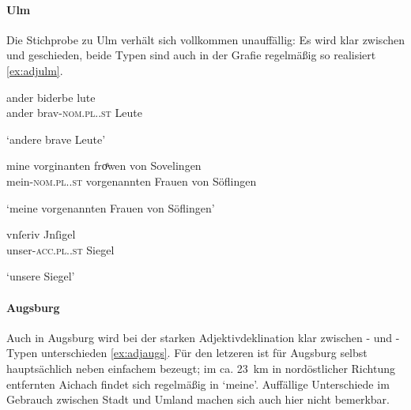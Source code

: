\paragraph{Ulm}
\label{par:adjulm}
Die Stichprobe zu Ulm verhält sich vollkommen unauffällig: Es wird klar
zwischen  und  geschieden, beide Typen sind auch in der
Grafie regelmäßig so realisiert \cref{ex:adjulm}.

\begin{exe}
\ex \label{ex:adjulm}
	\begin{xlist}
	\ex \label{ex:adjulm_1}
		\gll ander biderbe lute \\
			ander brav-\textsc{nom.pl.\MascX.st} Leute \\
		\begin{taggedline}{\parencites(Ulm, 1299)[\pno~3308, 455.44]{cao4}}
		\trans `andere brave Leute'
		\end{taggedline}

	\ex \label{ex:adjulm_2}
		\gll mine vorginanten froͤwen von Sovelingen \\
			mein-\textsc{nom.pl.\FemF.st} vorgenannten Frauen von Söflingen \\
		\begin{taggedline}{\parencites(Ulm, 1296)[\pno~2467, 526.36]{cao3}}
		\trans `meine vorgenannten Frauen von Söflingen'
		\end{taggedline}

	\ex \label{ex:adjulm_3}
		\gll vnſeriv Jnſigel \\
			unser-\textsc{acc.pl.\NeutI.st} Siegel \\
		\begin{taggedline}{\parencites(Ulm, 1293)[\pno~1662, 3.12--13]{cao3}}
		\trans `unsere Siegel'
		\end{taggedline}
	\end{xlist}
\end{exe}

\paragraph{Augsburg}
\label{par:adjaugsburg}
Auch in Augsburg wird bei der starken Adjektivdeklination klar zwischen
- und -Typen unterschieden \cref{ex:adjaugs}. Für den letzeren
ist für Augsburg selbst hauptsächlich  neben einfachem 
bezeugt; im ca. 23~km in nordöstlicher Richtung entfernten Aichach findet sich
regelmäßig  in  `meine'. Auffällige Unterschiede im
Gebrauch zwischen Stadt und Umland machen sich auch hier nicht bemerkbar.

